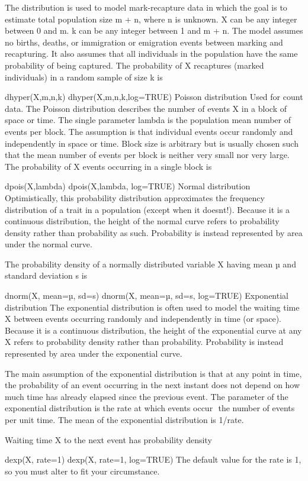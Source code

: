 The distribution is used to model mark-recapture data in which the goal is to estimate total population size m + n, where n is unknown. X can be any integer between 0 and m. k can be any integer between 1 and m + n. The model assumes no births, deaths, or immigration or emigration events between marking and recapturing. It also assumes that all individuals in the population have the same probability of being captured. The probability of X recaptures (marked individuals) in a random sample of size k is

dhyper(X,m,n,k)
dhyper(X,m,n,k,log=TRUE)
Poisson distribution
Used for count data. The Poisson distribution describes the number of events X in a block of space or time. The single parameter lambda is the population mean number of events per block. The assumption is that individual events occur randomly and independently in space or time. Block size is arbitrary but is usually chosen such that the mean number of events per block is neither very small nor very large. The probability of X events occurring in a single block is

dpois(X,lambda)
dpois(X,lambda, log=TRUE)
Normal distribution
Optimistically, this probability distribution approximates the frequency distribution of a trait in a population (except when it doesnt!). Because it is a continuous distribution, the height of the normal curve refers to probability density rather than probability as such. Probability is instead represented by area under the normal curve.

The probability density of a normally distributed variable X having mean µ and standard deviation s is

dnorm(X, mean=µ, sd=s)
dnorm(X, mean=µ, sd=s, log=TRUE)
Exponential distribution
The exponential distribution is often used to model the waiting time X between events occurring randomly and independently in time (or space). Because it is a continuous distribution, the height of the exponential curve at any X refers to probability density rather than probability. Probability is instead represented by area under the exponential curve.

The main assumption of the exponential distribution is that at any point in time, the probability of an event occurring in the next instant does not depend on how much time has already elapsed since the previous event. The parameter of the exponential distribution is the rate at which events occur  the number of events per unit time. The mean of the exponential distribution is 1/rate.

Waiting time X to the next event has probability density

dexp(X, rate=1)
dexp(X, rate=1, log=TRUE)
The default value for the rate is 1, so you must alter to fit your circumstance.

